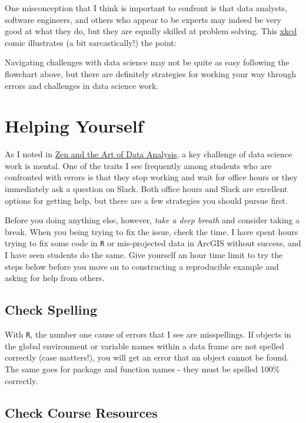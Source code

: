 \documentclass[]{book}
\theoremstyle{definition}
\theoremstyle{definition}
\theoremstyle{definition}
\theoremstyle{remark}
\begin{document}
One misconception that I think is important to confront is that data
analysts, software engineers, and others who appear to be experts may
indeed be very good at what they do, but they are equally skilled at
problem solving. This \href{https://www.xkcd.com}{xkcd} comic
illustrates (a bit sarcastically!) the point:

Navigating challenges with data science may not be quite as easy
following the flowchart above, but there are definitely strategies for
working your way through errors and challenges in data science work.

\hypertarget{helping-yourself}{\section{Helping
Yourself}\label{helping-yourself}}

As I noted in \protect\hyperlink{zen-and-the-art-of-data-analysis}{Zen
and the Art of Data Analysis}, a key challenge of data science work is
mental. One of the traits I see frequently among students who are
confronted with errors is that they stop working and wait for office
hours or they immediately ask a question on Slack. Both office hours and
Slack are excellent options for getting help, but there are a few
strategies you should pursue first.

Before you doing anything else, however, \emph{take a deep breath} and
consider taking a break. When you being trying to fix the issue, check
the time. I have spent hours trying to fix some code in \texttt{R} or
mis-projected data in ArcGIS without success, and I have seen students
do the same. Give yourself an hour time limit to try the steps below
before you move on to constructing a reproducible example and asking for
help from others.

\subsection{Check Spelling}\label{check-spelling}

With \texttt{R}, the number one cause of errors that I see are
misspellings. If objects in the global environment or variable names
within a data frame are not spelled correctly (case matters!), you will
get an error that an object cannot be found. The same goes for package
and function names - they must be spelled 100\% correctly.

\subsection{Check Course Resources}\label{check-course-resources}
\end{document}
